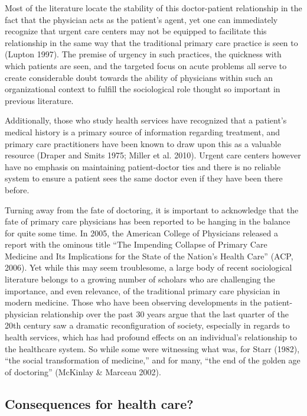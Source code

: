 \documentclass[12pt,twoside]{reedthesis}
\begin{document}
  Most of the literature locate the stability of this doctor-patient
  relationship in the fact that the physician acts as the patient's agent,
  yet one can immediately recognize that urgent care centers may not be
  equipped to facilitate this relationship in the same way that the
  traditional primary care practice is seen to (Lupton 1997). The premise
  of urgency in such practices, the quickness with which patients are
  seen, and the targeted focus on acute problems all serve to create
  considerable doubt towards the ability of physicians within such an
  organizational context to fulfill the sociological role thought so
  important in previous literature.
  
  Additionally, those who study health services have recognized that a
  patient's medical history is a primary source of information regarding
  treatment, and primary care practitioners have been known to draw upon
  this as a valuable resource (Draper and Smits 1975; Miller et al. 2010).
  Urgent care centers however have no emphasis on maintaining
  patient-doctor ties and there is no reliable system to ensure a patient
  sees the same doctor even if they have been there before.
  
  Turning away from the fate of doctoring, it is important to acknowledge
  that the fate of primary care physicians has been reported to be hanging
  in the balance for quite some time. In 2005, the American College of
  Physicians released a report with the ominous title ``The Impending
  Collapse of Primary Care Medicine and Its Implications for the State of
  the Nation's Health Care'' (ACP, 2006). Yet while this may seem
  troublesome, a large body of recent sociological literature belongs to a
  growing number of scholars who are challenging the importance, and even
  relevance, of the traditional primary care physician in modern medicine.
  Those who have been observing developments in the patient-physician
  relationship over the past 30 years argue that the last quarter of the
  20th century saw a dramatic reconfiguration of society, especially in
  regards to health services, which has had profound effects on an
  individual's relationship to the healthcare system. So while some were
  witnessing what was, for Starr (1982), ``the social transformation of
  medicine,'' and for many, ``the end of the golden age of doctoring''
  (McKinlay \& Marceau 2002).
  
  \subsection*{Consequences for health
  care?}\label{consequences-for-health-care}
  
\end{document}
